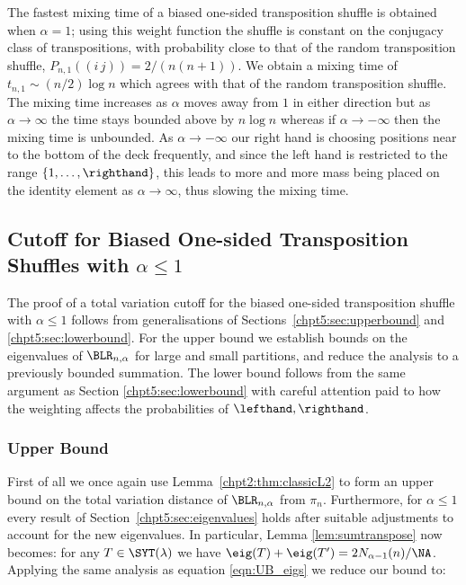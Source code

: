 \documentclass[11pt]{report}
\begin{document}
The fastest mixing time of a biased one-sided transposition shuffle is obtained when $\alpha = 1$; using this weight function the shuffle is constant on the conjugacy class 
of transpositions, with probability close to that of the random 
transposition shuffle, $P_{n,1}((i \, j)) = 2/(n(n+1))$.
We obtain a mixing time of $t_{n,1} \sim (n/2)\log n$ which agrees with that of 
the random transposition shuffle. The mixing time increases as $\alpha$ moves 
away from $1$ in either direction but as $\alpha \to \infty$ the time
stays bounded above by $n\log n$ whereas if $\alpha \to -\infty$ then the mixing time is unbounded. As $\alpha \to -\infty$ our right hand is choosing positions near to the bottom of the deck frequently, and since the left hand is restricted to the range $\{1,\ldots, \righthand\}$, this leads to more and more mass being placed on the identity element as $\alpha \to\infty$, thus slowing the mixing time.





\subsection{Cutoff for Biased One-sided Transposition Shuffles with $\alpha \leq 1$}
\label{chpt5:subsec:smallalpha}



The proof of a total variation cutoff for the biased one-sided transposition shuffle with $\alpha \leq1$ follows from generalisations of Sections~\ref{chpt5:sec:upperbound} and \ref{chpt5:sec:lowerbound}. For the upper bound we establish bounds on the eigenvalues of $\BLR_{n,\alpha}$ for large and small partitions, and reduce the analysis to a previously bounded summation. The lower bound follows from the same argument as Section \ref{chpt5:sec:lowerbound} with careful attention paid to how the weighting affects the probabilities of $\lefthand, \righthand$. 


\subsubsection{Upper Bound}
\label{GENUPPERBOUNDSMALLALPHA}
First of all we once again use Lemma~\ref{chpt2:thm:classicL2} to form an upper bound on the total variation distance of $\BLR_{n,\alpha}$ from $\pi_{n}$.
Furthermore, for $\alpha\leq 1$ every result of Section~\ref{chpt5:sec:eigenvalues} holds after suitable adjustments to account for the new eigenvalues. In particular, Lemma \ref{lem:sumtranspose} now becomes: for any $T \in \SYT(\lambda)$ we have $\eig(T) + \eig(T^{\prime}) = 2 N_{\alpha-1}(n) /\NA $. Applying the same analysis as equation \eqref{eqn:UB_eigs} we reduce our bound to:
\end{document}

